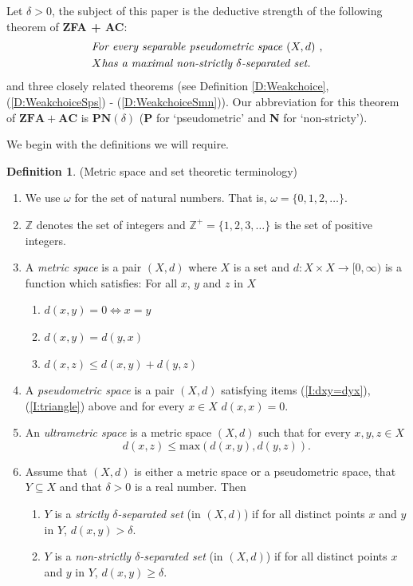 \documentclass[11pt, reqno]{amsart}
\theoremstyle{definition}
\numberwithin{theorem}{section}
\theoremstyle{definition}
\theoremstyle{definition}
\theoremstyle{definition}
\theoremstyle{definition}
\newtheorem{definition}[theorem]{Definition}
\theoremstyle{definition}
\numberwithin{claim}{section}
\theoremstyle{definition}
\theoremstyle{definition}
\theoremstyle{definition}
\theoremstyle{definition}
\theoremstyle{definition}
\newcommand{\PN}{\mathbf{PN}(\delta)}
\theoremstyle{remboldstyle}
\begin{document}
Let $\delta>0$, the subject of this paper is the deductive strength of the following theorem of \textbf{ZFA + AC}:
\begin{equation*}
\begin{aligned}
&\mbox{\it For every separable pseudometric space $(X, d)$ },\\ & X \mbox{\it has a maximal non-strictly } \delta\mbox{\it -separated set.}
\end{aligned}
\end{equation*}
 and three closely related theorems (see Definition \ref{D:Weakchoice}, (\ref{D:WeakchoiceSps}) - (\ref{D:WeakchoiceSmn})).
Our abbreviation for this theorem of $\mathbf{ZFA + AC}$ is $\PN$ (\textbf{P} for `pseudometric' and \textbf{N} for `non-stricty'). 

We begin with the definitions we will require.
\begin{definition}
(Metric space and set theoretic terminology)
\begin{enumerate}
\item We use $\omega$ for the set of natural numbers.  That is, $\omega = \{0, 1, 2, \ldots \}$.
\item $\mathbb{Z}$ denotes the set of integers and $\mathbb{Z}^+ = \{ 1, 2, 3, \ldots \}$ is the set of positive integers.
\item 
A \emph{metric space} is a pair $(X,d)$ where $X$ is a set and $d: X \times X \to [0, \infty)$ is a function which satisfies: For all $x$, $y$ and $z$ in $X$
 \begin{enumerate}
 \item \label{I:dxx=0} $d(x,y) = 0 \iff x=y$ 
 \item \label{I:dxy=dyx} $d(x,y) = d(y,x)$
 \item \label{I:triangle} $d(x,z) \le d(x,y) + d(y,z)$
 \end{enumerate}
\item 
 A \emph{pseudometric space} is a pair $(X,d)$ satisfying items (\ref{I:dxy=dyx}), (\ref{I:triangle}) above and for every $x \in X$ $d(x,x)=0$.
 \item 
An \emph{ultrametric space} is a metric space $(X,d)$  such that  for every $x, y, z \in X$
\[
d(x,z) \le \mbox{max}(d(x,y), d(y,z)).
\]
\item Assume that $(X,d)$ is either a metric space or a pseudometric space, that $Y  \subseteq X$ and that $\delta > 0$ is a real number. Then
 \begin{enumerate}
 \item $Y$ is a \emph{strictly $\delta$-separated set} (in $(X,d)$) if for all distinct points $x$ and $y$ in $Y$, $d(x,y) > \delta$.
 \item $Y$ is a \emph{non-strictly $\delta$-separated set} (in $(X,d)$) if for all distinct points $x$ and $y$ in $Y$, $d(x,y) \ge \delta$.
 \end{enumerate}
\end{enumerate} 
\end{definition}
\end{document}
